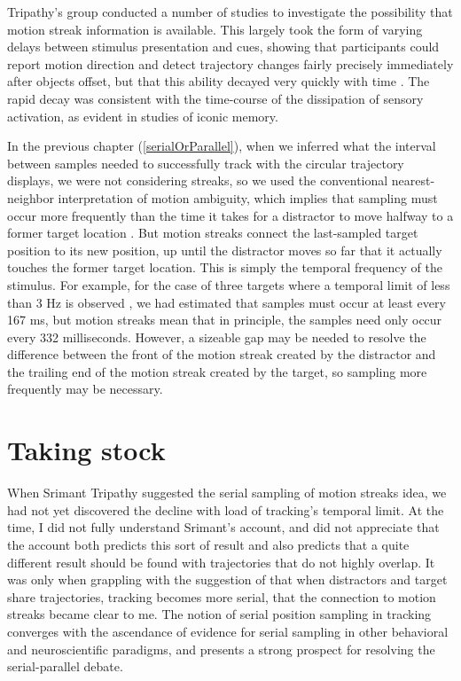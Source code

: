 \documentclass[
]{book}
\begin{document}
Tripathy's group conducted a number of studies to investigate the possibility that motion streak information is available. This largely took the form of varying delays between stimulus presentation and cues, showing that participants could report motion direction and detect trajectory changes fairly precisely immediately after objects offset, but that this ability decayed very quickly with time \citep{narasimhanLossPositionalInformation2009, shoonerHighcapacityTransientRetention2010}. The rapid decay was consistent with the time-course of the dissipation of sensory activation, as evident in studies of iconic memory.

In the previous chapter (\ref{serialOrParallel}), when we inferred what the interval between samples needed to successfully track with the circular trajectory displays, we were not considering streaks, so we used the conventional nearest-neighbor interpretation of motion ambiguity, which implies that sampling must occur more frequently than the time it takes for a distractor to move halfway to a former target location \citep{holcombeIllusoryMotionReversal2005}. But motion streaks connect the last-sampled target position to its new position, up until the distractor moves so far that it actually touches the former target location. This is simply the temporal frequency of the stimulus. For example, for the case of three targets where a temporal limit of less than 3 Hz is observed \citep{holcombeSplittingAttentionReduces2013, roudaiaDifferentEffectsAging2017}, we had estimated that samples must occur at least every 167 ms, but motion streaks mean that in principle, the samples need only occur every 332 milliseconds. However, a sizeable gap may be needed to resolve the difference between the front of the motion streak created by the distractor and the trailing end of the motion streak created by the target, so sampling more frequently may be necessary.

\hypertarget{taking-stock}{%
\section{Taking stock}\label{taking-stock}}

When Srimant Tripathy suggested the serial sampling of motion streaks idea, we had not yet discovered the decline with load of tracking's temporal limit. At the time, I did not fully understand Srimant's account, and did not appreciate that the account both predicts this sort of result and also predicts that a quite different result should be found with trajectories that do not highly overlap. It was only when grappling with the suggestion of \citet{lovettSelectionEnablesEnhancement2019} that when distractors and target share trajectories, tracking becomes more serial, that the connection to motion streaks became clear to me. The notion of serial position sampling in tracking converges with the ascendance of evidence for serial sampling in other behavioral and neuroscientific paradigms, and presents a strong prospect for resolving the serial-parallel debate.
\end{document}
